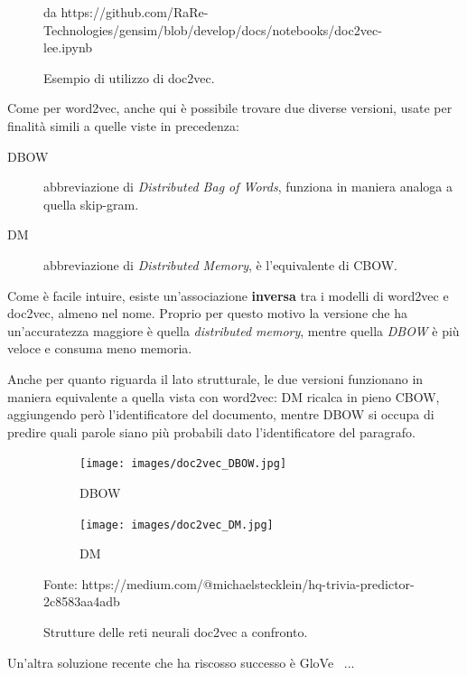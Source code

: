 \documentclass[12pt,a4paper,twoside,openright]{book}
\begin{document}
\fboxrule=0.5pt %
    \begin{figure}[H]
    \centering
    \caption{
    Esempio di utilizzo di doc2vec.}
    \tiny{da https://github.com/RaRe-Technologies/gensim/blob/develop/docs/notebooks/doc2vec-lee.ipynb}
    \label{fig:doc2vec_example}
\end{figure}


Come per word2vec, anche qui è possibile trovare due diverse versioni, usate per finalità simili a quelle viste in precedenza:
\begin{description}
    \item [DBOW] abbreviazione di \emph{Distributed Bag of Words}, funziona in maniera analoga a quella skip-gram.
    \item [DM] abbreviazione di \emph{Distributed Memory}, è l'equivalente di CBOW.
\end{description}

Come è facile intuire, esiste un'associazione \textbf{inversa} tra i modelli di word2vec e doc2vec, almeno nel nome. Proprio per questo motivo la versione che ha un'accuratezza maggiore è quella \emph{distributed memory}, mentre quella \emph{DBOW} è più veloce e consuma meno memoria.

Anche per quanto riguarda il lato strutturale, le due versioni funzionano in maniera equivalente a quella vista con word2vec: DM ricalca in pieno CBOW, aggiungendo però l'identificatore del documento, mentre DBOW si occupa di predire quali parole siano più probabili dato l'identificatore del paragrafo.

\begin{figure}[H]
    \centering
    \begin{subfigure}[b]{0.45\textwidth}
        \texttt{[image: images/doc2vec\_DBOW.jpg]}
        \caption{DBOW}
    \end{subfigure}
    \begin{subfigure}[b]{0.48\textwidth}
        \texttt{[image: images/doc2vec\_DM.jpg]}
        \caption{DM}
    \end{subfigure}
    \caption{Strutture delle reti neurali doc2vec a confronto.}
    \tiny{Fonte: https://medium.com/@michaelstecklein/hq-trivia-predictor-2c8583aa4adb~\cite{gulli2017deep}}
    \label{fig:neural_doc2vec}
\end{figure}

Un'altra soluzione recente che ha riscosso successo è GloVe~\cite{DBLP:conf/emnlp/PenningtonSM14} ...
\end{document}
